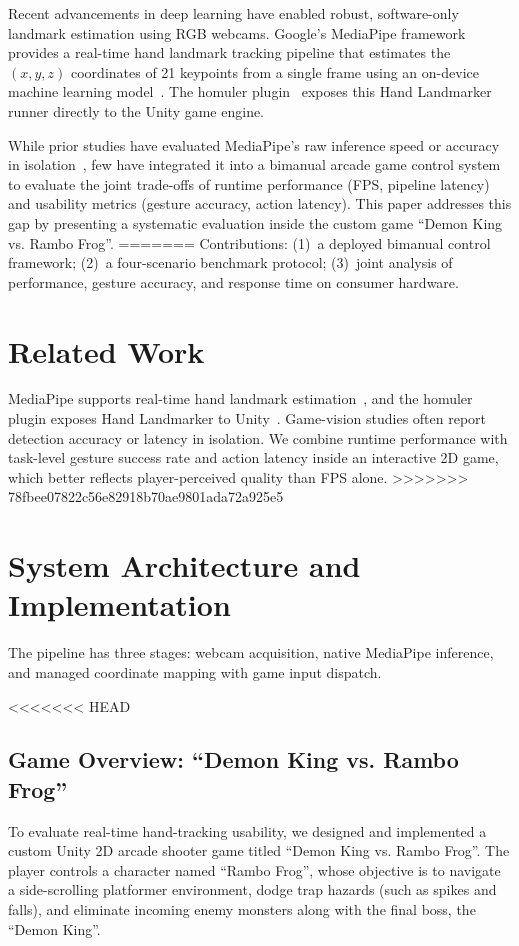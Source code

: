 \documentclass[journal,onecolumn,12pt,draftclsnofoot]{IEEEtran}
\begin{document}
Recent advancements in deep learning have enabled robust, software-only landmark estimation using RGB webcams. Google's MediaPipe framework~\cite{b1} provides a real-time hand landmark tracking pipeline that estimates the $(x, y, z)$ coordinates of 21 keypoints from a single frame using an on-device machine learning model~\cite{b3}. The homuler plugin~\cite{b2} exposes this Hand Landmarker runner directly to the Unity game engine. 

While prior studies have evaluated MediaPipe's raw inference speed or accuracy in isolation~\cite{b5}, few have integrated it into a bimanual arcade game control system to evaluate the joint trade-offs of runtime performance (FPS, pipeline latency) and usability metrics (gesture accuracy, action latency). This paper addresses this gap by presenting a systematic evaluation inside the custom game ``Demon King vs. Rambo Frog''.
=======
Contributions: (1)~a deployed bimanual control framework; (2)~a four-scenario benchmark protocol; (3)~joint analysis of performance, gesture accuracy, and response time on consumer hardware.

\section{Related Work}
MediaPipe supports real-time hand landmark estimation~\cite{b1}, and the homuler plugin exposes Hand Landmarker to Unity~\cite{b2}. Game-vision studies often report detection accuracy or latency in isolation. We combine runtime performance with task-level gesture success rate and action latency inside an interactive 2D game, which better reflects player-perceived quality than FPS alone.
>>>>>>> 78fbee07822c56e82918b70ae9801ada72a925e5

\section{System Architecture and Implementation}
The pipeline has three stages: webcam acquisition, native MediaPipe inference, and managed coordinate mapping with game input dispatch.

<<<<<<< HEAD
\subsection{Game Overview: ``Demon King vs. Rambo Frog''}
To evaluate real-time hand-tracking usability, we designed and implemented a custom Unity 2D arcade shooter game titled ``Demon King vs. Rambo Frog''. The player controls a character named ``Rambo Frog'', whose objective is to navigate a side-scrolling platformer environment, dodge trap hazards (such as spikes and falls), and eliminate incoming enemy monsters along with the final boss, the ``Demon King''.
\end{document}
